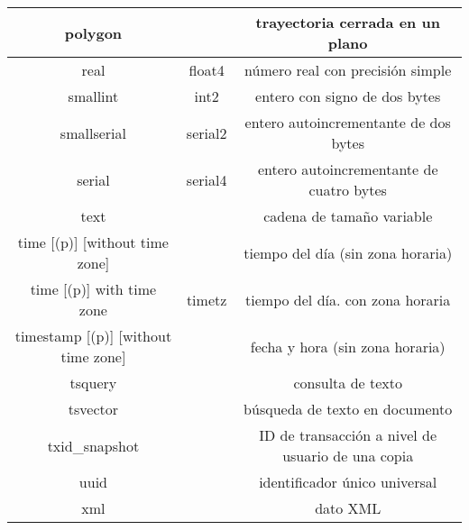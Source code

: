\documentclass[11pt]{article}
\begin{document}
\begin{center}
\begin{tabular}{ |c|c|c|  }
polygon && trayectoria cerrada en un plano\\
\hline
real & float4 & número real con precisión simple\\
\hline
smallint & int2 & entero con signo de dos bytes\\
\hline
smallserial & serial2 & entero autoincrementante de dos bytes\\
\hline
serial & serial4 & entero autoincrementante de cuatro bytes\\
\hline
text && cadena de tamaño variable\\
\hline
time [(p)] [without time zone] && tiempo del día (sin zona horaria)\\
\hline
time [(p)] with time zone & timetz & tiempo del día. con zona horaria\\
\hline
timestamp [(p)] [without time zone] && fecha y hora (sin zona horaria)\\
\hline
tsquery && consulta de texto\\
\hline
tsvector && búsqueda de texto en documento\\
\hline
txid\_snapshot && ID de transacción a nivel de usuario de una copia\\
\hline
uuid && identificador único universal\\
\hline
xml && dato XML\\
 \hline
\end{tabular}
\end{center}
\end{document}
